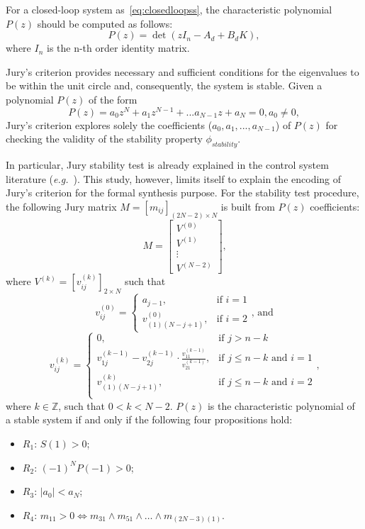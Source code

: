 \documentclass[runningheads,a4paper]{llncs}
\newcommand{\addtodo}[1]{{\color{red} TODO: #1}}
\begin{document}

For a closed-loop system as~\eqref{eq:closedloopss}, 
the characteristic polynomial $P(z)$ should be computed as follows:
\begin{equation}
P(z)= \det( z I_{n} - A_d + B_d K ),
\end{equation}
where $I_{n}$ is the n-th order identity matrix. 

Jury's criterion provides necessary and sufficient conditions for the eigenvalues 
to be within the unit circle and, consequently, the system is stable.  Given a 
polynomial $P(z)$ of the form
$$
P(z) = a_{0}z^{N} + a_{1}z^{N-1} + ... a_{N-1}z + a_{N} = 0, a_{0}\neq 0,
$$
Jury's criterion explores solely the coefficients ($a_{0},a_{1},...,a_{N-1}$) 
of $P(z)$ for checking the validity of the stability property $\phi_{stability}$. 

In particular, Jury stability test is already explained in the control system 
literature ({\it e.g.}~\cite{fadali}). This study, however, limits itself to 
explain the encoding of Jury's criterion for the formal synthesis purpose. 
For the stability  test procedure, the following Jury matrix 
$M=[m_{ij}]_{(2N-2)\times N}$ is built  from $P(z)$ coefficients:
$$
M=\left[
\begin{matrix}
  V^{(0)} \\
  V^{(1)} \\
  \vdots \\
  V^{(N-2)}
 \end{matrix}
\right]\mbox{,}
$$
\noindent where $V^{(k)}=[v^{(k)}_{ij}]_{2\times N}$ such that
$$
v^{(0)}_{ij}=\begin{cases} 
a_{j-1}, & \mbox{if } i=1 \\   v^{(0)}_{(1)(N-j+1)}, & \mbox{if } i=2 
\end{cases}\mbox{, and} 
$$
$$
v^{(k)}_{ij}=\begin{cases} 
0, & \mbox{if } j>n-k\\
v^{(k-1)}_{1j}-v^{(k-1)}_{2j}\cdot\frac{v^{(k-1)}_{11}}{v^{(k-1)}_{21}}, & \mbox{if } j\leq n-k  \mbox{ and } i=1 \\
v^{(k)}_{(1)(N-j+1)}, & \mbox{if } j\leq n-k \mbox{ and } i=2 \\
\end{cases} \mbox{,}
$$
\noindent where $k\in\mathbb{Z}$, such that $0<k<N-2$. $P(z)$ is the 
characteristic polynomial of a stable system if and only if the following 
four propositions hold:
\begin{itemize}
\item $R_{1}$: $S(1)>0$;
\item $R_{2}$: $(-1)^{N}P(-1)>0$;
\item $R_{3}$: $\vert{a_{0}}\vert <a_{N}$;
\item $R_{4}$: $m_{11}>0\iff m_{31}\wedge m_{51}\wedge \dots \wedge m_{(2N-3)(1)}$.
\end{itemize}
\end{document}
